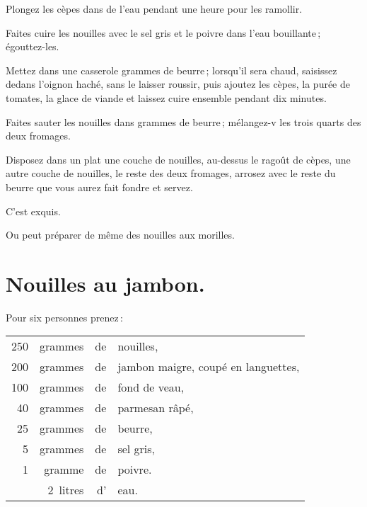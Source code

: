 Plongez les cèpes dans de l'eau pendant une heure pour les ramollir.

Faites cuire les nouilles avec le sel gris et le poivre dans l'eau bouillante ;
égouttez-les.

Mettez dans une casserole {\mmm} grammes de beurre ; lorsqu'il sera
chaud, saisissez dedans l'oignon haché, sans le laisser roussir, puis ajoutez
les cèpes, la purée de tomates, la glace de viande et laissez cuire ensemble
pendant dix minutes.

Faites sauter les nouilles dans {\mmm} grammes de beurre ; mélangez-v les
trois quarts des deux fromages.

Disposez dans un plat une couche de nouilles, au-dessus le ragoût de cèpes, une
autre couche de nouilles, le reste des deux fromages, arrosez avec le reste du
beurre que vous aurez fait fondre et servez.

C'est exquis.

\sk

Ou peut préparer de même des nouilles aux morilles.

\section*{\centering Nouilles au jambon.}
{}

Pour six personnes prenez :

\footnotesize
\begin{longtable}{rrrp{16em}}
    250 & grammes  & de & nouilles,                                                                       \\
    200 & grammes  & de & jambon maigre, coupé en languettes,                                             \\
    100 & grammes  & de & fond de veau,                                                                   \\
     40 & grammes  & de & parmesan râpé,                                                                  \\
     25 & grammes  & de & beurre,                                                                         \\
      5 & grammes  & de & sel gris,                                                                       \\
      1 & gramme   & de & poivre.                                                                         \\
        & 2 litres & d' & eau.                                                                            \\
\end{longtable}
\normalsize

